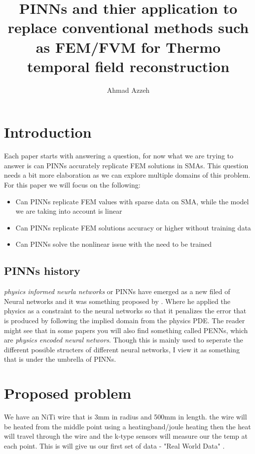 \documentclass[12pt, a4paper]{article}
\title{PINNs and thier application to replace conventional methods such as FEM/FVM for Thermo temporal field reconstruction}
\author{Ahmad Azzeh}
\date{}
\begin{document}
\maketitle
\tableofcontents
\newpage
\section{Introduction}

Each paper starts with answering a question, for now what we are trying to answer is can PINNs accurately replicate FEM solutions in SMAs. This question needs a bit more elaboration as we can explore multiple domains of this problem. For this paper we will focus on the following:

\begin{itemize}
    \item Can PINNs replicate FEM values with sparse data on SMA, while the model we are taking into account is linear
    \item Can PINNs replicate FEM solutions accuracy or higher without training data
    \item Can PINNs solve the nonlinear issue with the need to be trained
    
\end{itemize}

\subsection{PINNs history}
\emph{physics informed neurla networks} or PINNs have emerged as a new filed of Neural networks and it was something proposed by \citep{raissi2019}. Where he applied the physics as a constraint to the neural networks so that it penalizes the error that is produced by following the implied domain from the physics PDE. The reader might see that in some papers you will also find something called PENNs, which are \emph{physics encoded neural networs}. Though this is mainly used to seperate the different possible structers of different neural networks, I view it as something that is under the umbrella of PINNs. 

\section{Proposed problem}
We have an NiTi wire that is 3mm in radius and 500mm in length.
the wire will be heated from the middle point using a heatingband/joule heating then the heat will travel through the wire and the k-type sensors will measure our the temp at each point. This is will give us our first set of data - "Real World Data" .
\end{document}
